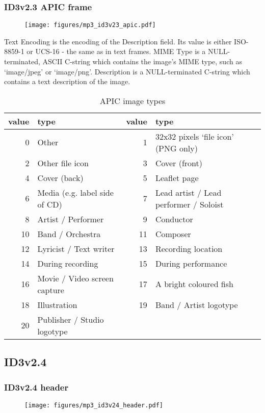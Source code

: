 \subsubsection{ID3v2.3 APIC frame}
\begin{figure}[h]
\texttt{[image: figures/mp3\_id3v23\_apic.pdf]}
\end{figure}
Text Encoding is the encoding of the Description field.
Its value is either ISO-8859-1 or UCS-16 - the same as in
text frames.
MIME Type is a NULL-terminated, ASCII C-string which contains the
image's MIME type, such as `image/jpeg' or `image/png'.
Description is a NULL-terminated C-string which contains
a text description of the image.
\begin{table}[h]
{
\begin{tabular}{|r|l||r|l|}
\hline
value & type & value & type \\
\hline
0 & Other & 1 & 32x32 pixels `file icon' (PNG only) \\
2 & Other file icon & 3 & Cover (front) \\
4 & Cover (back) & 5 & Leaflet page \\
6 & Media (e.g. label side of CD) & 7 & Lead artist / Lead performer / Soloist \\
8 & Artist / Performer & 9 & Conductor \\
10 & Band / Orchestra & 11 & Composer \\
12 & Lyricist / Text writer & 13 & Recording location \\
14 & During recording & 15 & During performance \\
16 & Movie / Video screen capture & 17 & A bright coloured fish \\
18 & Illustration & 19 & Band / Artist logotype \\
20 & Publisher / Studio logotype & &  \\
\hline
\end{tabular}
\caption{APIC image types}
}
\end{table}

\pagebreak

\subsection{ID3v2.4}
\subsubsection{ID3v2.4 header}
\begin{figure}[h]
\texttt{[image: figures/mp3\_id3v24\_header.pdf]}
\end{figure}


